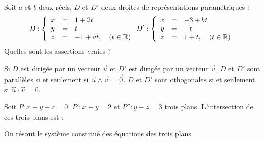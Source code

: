 \begin{question} 
Soit $a$ et $b$ deux réels, $D$ et $D'$ deux droites de représentations paramétriques :
 $$D: \left\{\begin{array}{ccl}x&=&1+2t\\y&=&t\\ z&=&-1+at,\quad (t\in \mathbb{R}) \end{array}\right. D': \left\{\begin{array}{ccl}x&=&-3+bt\\y&=&-t\\ z&=&1+t,\quad (t\in \mathbb{R}) \end{array}\right. 
 $$ Quelles sont les assertions vraies ?
\begin{answers}



   
\end{answers}
\begin{explanations}
Si $D$ est dirigée par un vecteur $\vec{u}$ et $D'$ est dirigée par un vecteur $\vec{v}$, $D$ et $D'$ sont parallèles si et seulement si $\vec{u} \wedge \vec{v} = \overrightarrow 0$. $D$ et $D'$ sont othogonales si et seulement si $\vec{u} \cdot  \vec{v}=0$.
\end{explanations}

\end{question}

\begin{question} 
Soit $P : x+y-z=0$,  $P' : x-y=2$ et $P'' : y-z=3$ trois plans. L'intersection de ces trois plans est : 
\begin{answers}


 
    
   
\end{answers}
\begin{explanations}
On résout le système constitué des équations des trois plans.
\end{explanations}

\end{question}


